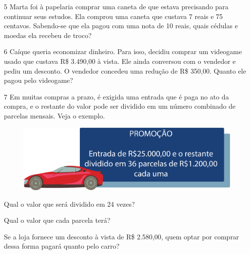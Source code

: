 \num{5} Marta foi à papelaria comprar uma caneta de que estava precisando para
continuar seus estudos. Ela comprou uma caneta que custava 7 reais e 75
centavos. Sabendo-se que ela pagou com uma nota de 10 reais, quais
cédulas e moedas ela recebeu de troco?

\num{6} Caíque queria economizar  dinheiro. Para isso, decidiu comprar um videogame usado
que custava R\$ 3.490,00 à vista. Ele ainda conversou com o vendedor e pediu
um desconto. O vendedor concedeu  uma redução de R\$ 350,00. Quanto ele pagou pelo videogame?

\num{7} Em muitas compras a prazo, é exigida uma entrada que é paga no ato da
compra, e o restante do valor pode ser dividido em um número combinado de
parcelas mensais. Veja o exemplo.

\begin{figure}[htpb!]
\centering
\includegraphics[width=\textwidth]{./media/image68.png}
\end{figure}

\begin{escolha}
\item Qual o valor que será dividido em 24 vezes?

\item Qual o valor que cada parcela terá?

\item Se a loja fornece um desconto à vista de R\$ 2.580,00, quem optar por
  comprar dessa forma pagará quanto pelo carro?
\end{escolha}


